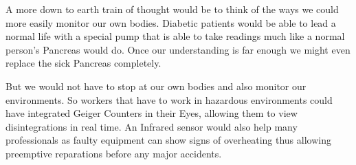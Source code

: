 \documentclass[
			12pt,
			a4paper,
			cleardoublepage=empty,
			final,
			twoside
				]{scrbook}
\begin{document}
      \begin{par}
        A more down to earth train of thought would be to think of the ways we could more easily monitor our own bodies. Diabetic patients would be able to lead a normal life with a special pump that is able to take readings much like a normal person's Pancreas would do. Once our understanding is far enough we might even replace the sick Pancreas completely.
      \end{par}
      \begin{par}
        But we would not have to stop at our own bodies and also monitor our environments. So workers that have to work in hazardous environments could have integrated Geiger Counters in their Eyes, allowing them to view disintegrations in real time. An Infrared sensor would also help many professionals as faulty equipment can show signs of overheating thus allowing preemptive reparations before any major accidents.
      \end{par}
\end{document}
